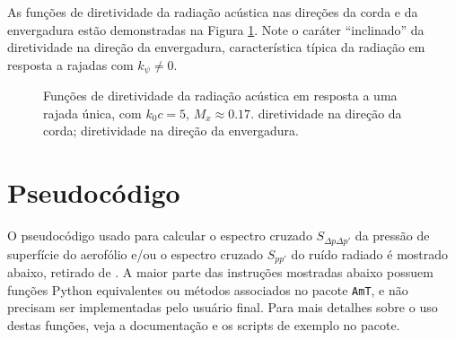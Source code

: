 \documentclass[a4paper, 11pt, twoside]{article}
\newcommand{\AmT}{\texttt{AmT}}
\begin{document}
As funções de diretividade da radiação acústica nas direções da corda e da envergadura estão demonstradas na Figura \ref{fig:dir_XZ_YZ_Kphi_035}. Note o caráter ``inclinado'' da diretividade na direção da envergadura, característica típica da radiação em resposta a rajadas com $k_\psi \neq 0$.

\begin{figure}
	\centering
	\caption{Funções de diretividade da radiação acústica em resposta a uma rajada única, com $k_0 c = 5$, $M_x \approx 0.17$. \protect{} diretividade na direção da corda; \protect{} diretividade na direção da envergadura.}
	\label{fig:dir_XZ_YZ_Kphi_035}
\end{figure}



\clearpage
\newpage
\section{Pseudocódigo}

O pseudocódigo usado para calcular o espectro cruzado $S_{\Delta p \Delta p'}$ da pressão de superfície do aerofólio e/ou o espectro cruzado $S_{pp'}$ do ruído radiado é mostrado abaixo, retirado de \cite{Casagrande_etal2020}. A maior parte das instruções mostradas abaixo possuem funções Python equivalentes ou métodos associados no pacote \AmT{}, e não precisam ser implementadas pelo usuário final. Para mais detalhes sobre o uso destas funções, veja a documentação e os scripts de exemplo no pacote.
\end{document}
